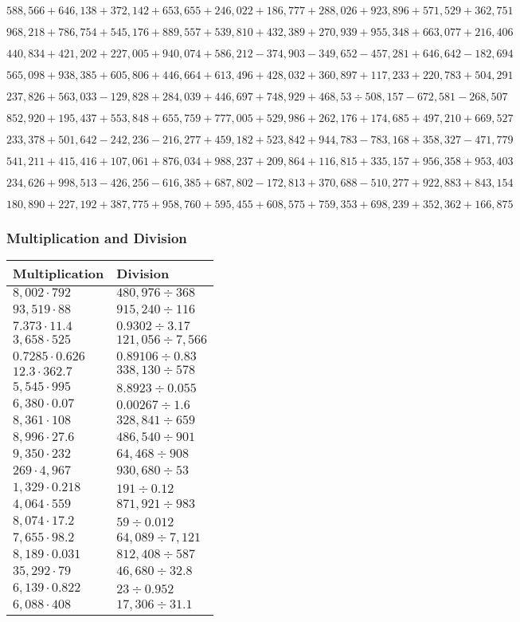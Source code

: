 \(588,566+646,138+372,142+653,655+246,022+186,777+288,026+923,896+571,529+ 362,751\)

\(968,218+786,754+545,176+889,557+539,810+432,389+270,939+955,348+663,077+216,406\)

\(440,834+421,202+227,005+940,074+586,212-374,903-349,652-457,281+646,642-182,694\)

\(565,098+938,385+605,806+446,664+613,496+428,032+360,897+117,233+220,783+504,291\)

\(237,826+563,033-129,828+284,039+446,697+748,929+468,53÷508,157-672,581-268,507\)

\(852,920+195,437+553,848+655,759+777,005+529,986+262,176+174,685+497,210+669,527\)

\(233,378+501,642-242,236-216,277+459,182+523,842+944,783-783,168+358,327-471,779\)

\(541,211+415,416+107,061+876,034+988,237+209,864+116,815+335,157+956,358+953,403\)

\(234,626+998,513-426,256-616,385+687,802-172,813+370,688-510,277+922,883+843,154\)

\(180,890+227,192+387,775+958,760+595,455+608,575+759,353+698,239+352,362+166,875\)

\hypertarget{multiplication-and-division-334}{%
\subsubsection{Multiplication and
Division}\label{multiplication-and-division-334}}

\begin{longtable}[]{@{}ll@{}}
\toprule
Multiplication & Division\tabularnewline
\midrule
\endhead
\(8,002\cdot792\) & \(480,976÷368\)\tabularnewline
\(93,519\cdot88\) & \(915,240 ÷116\)\tabularnewline
\(7.373\cdot11.4\) & \(0.9302÷3.17\)\tabularnewline
\(3,658\cdot525\) & \(121,056÷7,566\)\tabularnewline
\(0.7285\cdot0.626\) & \(0.89106÷0.83\)\tabularnewline
\(12.3\cdot362.7\) & \(338,130÷578\)\tabularnewline
\(5,545\cdot995\) & \(8.8923÷0.055\)\tabularnewline
\(6,380\cdot0.07\) & \(0.00267÷1.6\)\tabularnewline
\(8,361\cdot108\) & \(328,841÷659\)\tabularnewline
\(8,996\cdot27.6\) & \(486,540÷901\)\tabularnewline
\(9,350\cdot232\) & \(64,468÷908\)\tabularnewline
\(269\cdot4,967\) & \(930,680÷53\)\tabularnewline
\(1,329\cdot0.218\) & \(191÷0.12\)\tabularnewline
\(4,064\cdot559\) & \(871,921÷983\)\tabularnewline
\(8,074\cdot17.2\) & \(59÷0.012\)\tabularnewline
\(7,655\cdot98.2\) & \(64,089÷7,121\)\tabularnewline
\(8,189\cdot0.031\) & \(812,408÷587\)\tabularnewline
\(35,292\cdot79\) & \(46,680÷32.8\)\tabularnewline
\(6,139\cdot0.822\) & \(23÷0.952\)\tabularnewline
\(6,088\cdot408\) & \(17,306÷31.1\)\tabularnewline
\bottomrule
\end{longtable}

